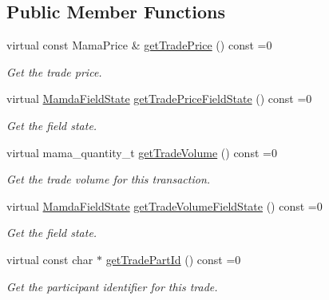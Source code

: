 \subsection*{Public Member Functions}
\begin{CompactItemize}
\item 
virtual const Mama\-Price \& \hyperlink{classWombat_1_1MamdaTradePossiblyDuplicate_af6c3350ba0d73411c51a8cc475e73ab}{get\-Trade\-Price} () const =0
\begin{CompactList}\small\item\em Get the trade price. \item\end{CompactList}\item 
virtual \hyperlink{namespaceWombat_93aac974f2ab713554fd12a1fa3b7d2a}{Mamda\-Field\-State} \hyperlink{classWombat_1_1MamdaTradePossiblyDuplicate_223865efb46d5616004c9d14da3c457b}{get\-Trade\-Price\-Field\-State} () const =0
\begin{CompactList}\small\item\em Get the field state. \item\end{CompactList}\item 
virtual mama\_\-quantity\_\-t \hyperlink{classWombat_1_1MamdaTradePossiblyDuplicate_f738f7c49a0e026f53dad8e9f2cf4a01}{get\-Trade\-Volume} () const =0
\begin{CompactList}\small\item\em Get the trade volume for this transaction. \item\end{CompactList}\item 
virtual \hyperlink{namespaceWombat_93aac974f2ab713554fd12a1fa3b7d2a}{Mamda\-Field\-State} \hyperlink{classWombat_1_1MamdaTradePossiblyDuplicate_fd783feb0c4a319b6e442613ecdf1c6c}{get\-Trade\-Volume\-Field\-State} () const =0
\begin{CompactList}\small\item\em Get the field state. \item\end{CompactList}\item 
virtual const char $\ast$ \hyperlink{classWombat_1_1MamdaTradePossiblyDuplicate_72a73e8ae29f30d81b3d78401f96589b}{get\-Trade\-Part\-Id} () const =0
\begin{CompactList}\small\item\em Get the participant identifier for this trade. \item\end{CompactList}\item 

\end{CompactItemize}
